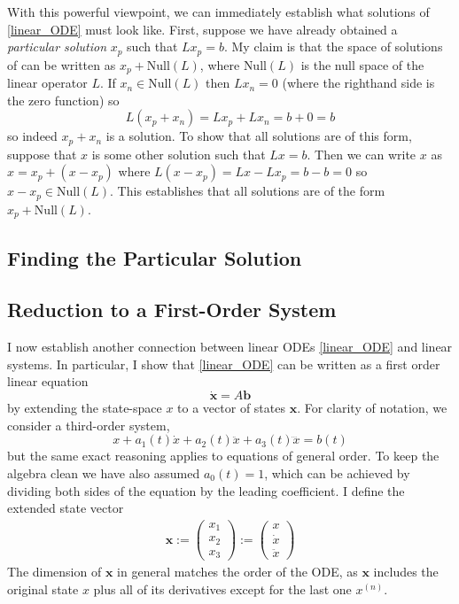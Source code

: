 \documentclass[12pt]{article}
\newcommand{\bx}{\mathbf{x}}
\newcommand{\bb}{\mathbf{b}}
\begin{document}
With this powerful viewpoint, we can immediately establish what solutions of \ref{linear_ODE} must look like. First, suppose we have already obtained a \textit{particular solution}
$x_p$ such that $L x_p = b$. My claim is that the space of solutions of \label{linear_ODE} can be written as $x_p + \text{Null}(L)$, where $\text{Null}(L)$ 
is the null space of the linear operator $L$. If $x_n \in \text{Null}(L)$ then $L x_n = 0$ (where the righthand side is the zero function) so 
\[L(x_p + x_n) = L x_p + L x_n = b + 0 = b\]
so indeed $x_p + x_n$ is a solution. To show that all solutions are of this form, suppose that $x$ is some other solution such that $Lx = b$. Then we can write $x$ as 
$x = x_p + (x - x_p)$ where $L(x - x_p) = Lx - L x_p = b - b = 0$ so $x - x_p \in \text{Null}(L)$. This establishes that all solutions are of the form $x_p + \text{Null}(L)$. 

\subsection{Finding the Particular Solution}

\subsection{Reduction to a First-Order System}
I now establish another connection between linear ODEs \ref{linear_ODE} and linear systems. In particular, I show that \ref{linear_ODE} can be written as a first order linear 
equation 
\[\dot{\bx} = A \bb \]
by extending the state-space $x$ to a vector of states $\bx$. For clarity of notation, we consider a third-order system,
\[x + a_1(t) \dot{x} + a_2(t) \ddot{x} + a_3(t) \dddot{x} = b(t)\]
but the same exact reasoning applies to equations of general order. To keep the algebra clean we have also assumed $a_0(t) = 1$, which can be achieved by dividing both 
sides of the equation by the leading coefficient. I define the extended state vector 
\begin{align*}
\bx :=  \begin{pmatrix} x_1 \\ x_2 \\ x_3 \end{pmatrix} := \begin{pmatrix} x \\ \dot{x} \\ \ddot{x} \end{pmatrix}
\end{align*}
The dimension of $\bx$ in general matches the order of the ODE, as $\bx$ includes the original state $x$ plus all of its derivatives except for the last one $x^{(n)}$. 
\end{document}
